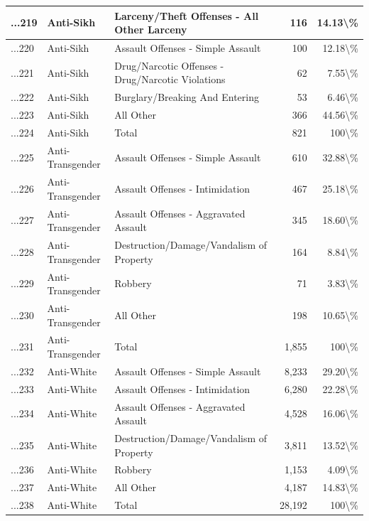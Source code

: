 \documentclass[
]{krantz}
\begin{document}
\begin{longtable}[t]{l|l|l|r|r}
\hline
...219 & Anti-Sikh & Larceny/Theft Offenses - All Other Larceny & 116 & 14.13\textbackslash{}\%\\
\hline
...220 & Anti-Sikh & Assault Offenses - Simple Assault & 100 & 12.18\textbackslash{}\%\\
\hline
...221 & Anti-Sikh & Drug/Narcotic Offenses - Drug/Narcotic Violations & 62 & 7.55\textbackslash{}\%\\
\hline
...222 & Anti-Sikh & Burglary/Breaking And Entering & 53 & 6.46\textbackslash{}\%\\
\hline
...223 & Anti-Sikh & All Other & 366 & 44.56\textbackslash{}\%\\
\hline
...224 & Anti-Sikh & Total & 821 & 100\textbackslash{}\%\\
\hline
...225 & Anti-Transgender & Assault Offenses - Simple Assault & 610 & 32.88\textbackslash{}\%\\
\hline
...226 & Anti-Transgender & Assault Offenses - Intimidation & 467 & 25.18\textbackslash{}\%\\
\hline
...227 & Anti-Transgender & Assault Offenses - Aggravated Assault & 345 & 18.60\textbackslash{}\%\\
\hline
...228 & Anti-Transgender & Destruction/Damage/Vandalism of Property & 164 & 8.84\textbackslash{}\%\\
\hline
...229 & Anti-Transgender & Robbery & 71 & 3.83\textbackslash{}\%\\
\hline
...230 & Anti-Transgender & All Other & 198 & 10.65\textbackslash{}\%\\
\hline
...231 & Anti-Transgender & Total & 1,855 & 100\textbackslash{}\%\\
\hline
...232 & Anti-White & Assault Offenses - Simple Assault & 8,233 & 29.20\textbackslash{}\%\\
\hline
...233 & Anti-White & Assault Offenses - Intimidation & 6,280 & 22.28\textbackslash{}\%\\
\hline
...234 & Anti-White & Assault Offenses - Aggravated Assault & 4,528 & 16.06\textbackslash{}\%\\
\hline
...235 & Anti-White & Destruction/Damage/Vandalism of Property & 3,811 & 13.52\textbackslash{}\%\\
\hline
...236 & Anti-White & Robbery & 1,153 & 4.09\textbackslash{}\%\\
\hline
...237 & Anti-White & All Other & 4,187 & 14.83\textbackslash{}\%\\
\hline
...238 & Anti-White & Total & 28,192 & 100\textbackslash{}\%\\

\end{longtable}
\end{document}
